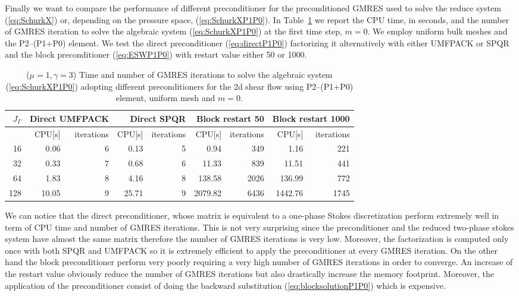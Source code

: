 Finally we want to compare the performance of different preconditioner
for the preconditioned GMRES used to solve the reduce system
(\ref{eq:SchurkX}) or, depending on the pressure space,
(\ref{eq:SchurkXP1P0}). In Table~\ref{tab:shear_2d_preconditioners} we report
the CPU time, in seconds, and the number of GMRES iteration to solve the
algebraic system (\ref{eq:SchurkXP1P0}) at the first time step, $m=0$. We
employ uniform bulk meshes and the P2--(P1+P0) element. We test the direct
preconditioner (\ref{eq:directP1P0}) factorizing it alternatively with either
UMFPACK or SPQR and the block preconditioner (\ref{eq:ESWP1P0}) with restart
value either 50 or 1000.
\begin{table}
\center
\hspace*{-3.25cm}
\begin{tabular}{rrrrrrrrr}
\hline
$J_\Gamma$ & \multicolumn{2}{r}{Direct UMFPACK} &
\multicolumn{2}{r}{Direct SPQR} & \multicolumn{2}{r}{Block restart 50} &
\multicolumn{2}{r}{Block restart 1000} \\
\hline
 & CPU[s] & iterations & CPU[s] & iterations & CPU[s] & iterations & CPU[s] &
iterations \\
\hline
 16 &  0.06 & 6 &  0.13 & 5 &    0.94 &  349 &    1.16 &  221 \\
 32 &  0.33 & 7 &  0.68 & 6 &   11.33 &  839 &   11.51 &  441 \\
 64 &  1.83 & 8 &  4.16 & 8 &  138.58 & 2026 &  136.99 &  772 \\
128 & 10.05 & 9 & 25.71 & 9 & 2079.82 & 6436 & 1442.76 & 1745 \\
\hline
\end{tabular}
\hspace*{-3.25cm}
\caption[Stokes 2d shear flow preconditioners comparison]
{($\mu=1,\gamma=3$) Time and number of GMRES iterations to solve the algebraic
system (\ref{eq:SchurkXP1P0}) adopting different preconditioners for the 2d
shear flow using P2--(P1+P0) element, uniform mesh and $m=0$.}
\label{tab:shear_2d_preconditioners}
\end{table}
We can notice that the direct preconditioner, whose matrix is equivalent to
a one-phase Stokes discretization perform extremely well in term of CPU time
and number of GMRES iterations. This is not very surprising since the
preconditioner and the reduced two-phase stokes system have almost the same
matrix therefore the number of GMRES iterations is very low. Moreover, the
factorization is computed only once with both SPQR and UMFPACK so it is
extremely efficient to apply the preconditioner at every GMRES iteration. On
the other hand the block preconditioner perform very poorly requiring a very
high number of GMRES iterations in order to converge. An increase of the
restart value obviously reduce the number of GMRES iterations but also
drastically increase the memory footprint. Moreover, the application of the
preconditioner consist of doing the backward substitution
(\ref{eq:blocksolutionP1P0}) which is expensive.

